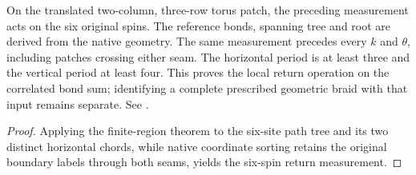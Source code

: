 \begin{theorem}
    \label{thm:peps_torus_six_spin_return_measurement}
    \leanok
    On the translated two-column, three-row torus patch, the preceding
    measurement acts on the six original spins. The reference bonds, spanning
    tree and root are derived from the native geometry. The same measurement
    precedes every $k$ and $\theta$, including patches crossing either seam.
    The horizontal period is at least three and the vertical period at least
    four. This proves the local return operation on the correlated
    bond sum; identifying a complete prescribed geometric braid with that
    input remains separate. See \cite{gap:rmp_peps_quantum_double_g_isometry}.
\end{theorem}
\begin{proof}
    \leanok
    Applying the finite-region theorem to the six-site path tree and its
    two distinct horizontal chords, while native coordinate sorting retains the
    original boundary labels through both seams, yields the six-spin return
    measurement.
\end{proof}
